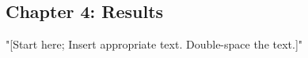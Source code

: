 \newpage
\begin{singlespace}
\section{\protect \centering Chapter 4: Results}
\end{singlespace}
\doublespacing
\noindent "[Start here; Insert appropriate text. Double-space the text.]"